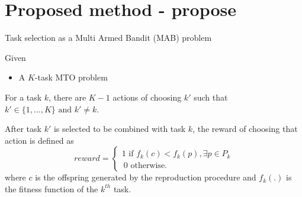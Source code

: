 \section{Proposed method - \gls{propose}}

\begin{frame}{Task selection as a Multi Armed Bandit (MAB) problem}
    \begin{block}{Given}
        \begin{itemize}
            \item A $K$-task MTO problem
        \end{itemize}
    \end{block}
    \begin{mydef}[Action]
        For a task $k$, there are $K-1$ actions of choosing $k'$ such that $k' \in \{1, \ldots, K\} \text{ and } k' \ne k$.
        \label{def:action}
    \end{mydef}
    \begin{mydef}[Reward]
        After task $k'$ is selected to be combined with task $k$, the reward of choosing that action is defined as 
        \begin{equation}
            reward = \left\{
                \begin{array}{ll}
                    1 \text{ if } f_k(c) < f_k(p) , \exists p \in P_k \\\
                    0 \text{ otherwise}.
                \end{array}
              \right.
        \end{equation}
        where $c$ is the offspring generated by the reproduction procedure and $f_k(.)$ is the fitness function of the $k^{th}$ task.
        \label{def:reward}
    \end{mydef}
\end{frame}

